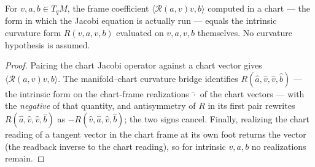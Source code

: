 \begin{lemma}
  \label{lem:dc-ch8-2-1-curvature-bridge}
  \leanok
  For $v,a,b\in T_qM$, the frame coefficient $\langle\mathcal R(a,v)v,b\rangle$ computed in a
  chart --- the form in which the Jacobi equation is actually run --- equals the intrinsic
  curvature form $R(v,a,v,b)$ evaluated on $v,a,v,b$ themselves. No curvature hypothesis is
  assumed.
\end{lemma}
\begin{proof}
  \leanok
\sketch
  Pairing the chart Jacobi operator against a chart vector gives
  $\langle\mathcal R(a,v)v,b\rangle$. The manifold--chart curvature bridge identifies
  $R(\hat a,\hat v,\hat v,\hat b)$ --- the intrinsic form on the chart-frame realizations
  $\hat\cdot$ of the chart vectors --- with the \emph{negative} of that quantity, and
  antisymmetry of $R$ in its first pair rewrites $R(\hat a,\hat v,\hat v,\hat b)$ as
  $-R(\hat v,\hat a,\hat v,\hat b)$; the two signs cancel. Finally, realizing the chart
  reading of a tangent vector in the chart frame at its own foot returns the vector
  (the readback inverse to the chart reading), so for intrinsic $v,a,b$ no realizations
  remain.
\end{proof}

